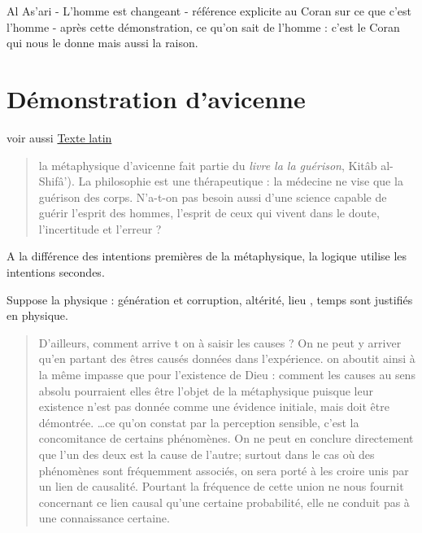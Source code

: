 \begin{Synthesis}
Al As'ari
- L'homme est changeant
- référence explicite au Coran sur ce que c'est l'homme
- après cette démonstration, ce qu'on sait de l'homme : c'est le Coran qui nous le donne mais aussi la raison.
\end{Synthesis}


\section{Démonstration d'avicenne}
voir aussi \href{https://books.google.fr/books?id=6jcTAQAAMAAJ&pg=RA1-PA6&lpg=RA1-PA6&dq=Inquirit+enim+universale+et+particulare,+potentiam+et+effectum,+possibile+et+necesse,+et+cetera&source=bl&ots=caRb6_MMwQ&sig=ACfU3U0jQ0xx5Be712aqaVYgR5qLnQa5Ng&hl=fr&sa=X&ved=2ahUKEwiGq8qvyNT3AhWvy4UKHXIHB5cQ6AF6BAgNEAM#v=onepage&q=vehementia&f=false}{Texte latin}

\begin{quote}
    la métaphysique d'avicenne fait partie du \textit{livre la la guérison}, Kitâb al-Shifâ'). La philosophie est une thérapeutique : la médecine ne vise que la guérison des corps. N'a-t-on pas besoin aussi d'une science capable de guérir l'esprit des hommes, l'esprit de ceux qui vivent dans le doute, l'incertitude et l'erreur ? 
\end{quote}
A la différence des intentions premières de la métaphysique, la logique utilise les intentions secondes. 

Suppose la physique : génération et corruption, altérité, lieu , temps sont justifiés en physique. 

\begin{quote}
    D'ailleurs, comment arrive t on à saisir les causes ? On ne peut y arriver qu'en partant des êtres causés données dans l'expérience. on aboutit ainsi à la même impasse que pour l'existence de Dieu : comment les causes au sens absolu pourraient elles être l'objet de la métaphysique puisque leur existence n'est pas donnée comme une évidence initiale, mais doit être démontrée.
    \ldots ce qu'on constat par la perception sensible, c'est la concomitance de certains phénomènes. On ne peut en conclure directement que l'un des deux est la cause de l'autre; surtout dans le cas où des phénomènes sont fréquemment associés, on sera porté à les croire unis par un lien de causalité. Pourtant la fréquence de cette union ne nous fournit concernant ce lien causal qu'une certaine probabilité, elle ne conduit pas à une connaissance certaine. 
\end{quote}

